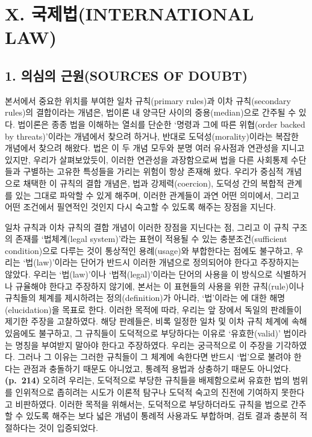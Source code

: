 \section{X. 국제법(INTERNATIONAL
LAW)}\label{x.-uxad6duxc81cuxbc95international-law}

\subsection{1. 의심의 근원(SOURCES OF
DOUBT)}\label{uxc758uxc2ecuxc758-uxadfcuxc6d0sources-of-doubt}

본서에서 중요한 위치를 부여한 일차 규칙(primary rules)과 이차
규칙(secondary rules)의 결합이라는 개념은, 법이론 내 양극단 사이의
중용(median)으로 간주될 수 있다. 법이론은 종종 법을 이해하는 열쇠를
단순한 `명령과 그에 따른 위협(order backed by threats)'이라는 개념에서
찾으려 하거나, 반대로 도덕성(morality)이라는 복잡한 개념에서 찾으려
해왔다. 법은 이 두 개념 모두와 분명 여러 유사점과 연관성을 지니고
있지만, 우리가 살펴보았듯이, 이러한 연관성을 과장함으로써 법을 다른
사회통제 수단들과 구별하는 고유한 특성들을 가리는 위험이 항상 존재해
왔다. 우리가 중심적 개념으로 채택한 이 규칙의 결합 개념은, 법과
강제력(coercion), 도덕성 간의 복합적 관계를 있는 그대로 파악할 수 있게
해주며, 이러한 관계들이 과연 어떤 의미에서, 그리고 어떤 조건에서
필연적인 것인지 다시 숙고할 수 있도록 해주는 장점을 지닌다.

일차 규칙과 이차 규칙의 결합 개념이 이러한 장점을 지닌다는 점, 그리고 이
규칙 구조의 존재를 `법체계(legal system)'라는 표현이 적용될 수 있는
충분조건(sufficient condition)으로 다루는 것이 통상적인 용례(usage)와
부합한다는 점에도 불구하고, 우리는 `법(law)'이라는 단어가 반드시 이러한
개념으로 정의되어야 한다고 주장하지는 않았다. 우리는 `법(law)'이나
`법적(legal)'이라는 단어의 사용을 이 방식으로 식별하거나 규율해야 한다고
주장하지 않기에, 본서는 이 표현들의 사용을 위한 규칙(rule)이나 규칙들의
체계를 제시하려는 정의(definition)가 아니라, `법'이라는
에 대한 해명(elucidation)을 목표로 한다. 이러한
목적에 따라, 우리는 앞 장에서 독일의 판례들이 제기한 주장을 고찰하였다.
해당 판례들은, 비록 일정한 일차 및 이차 규칙 체계에 속해 있음에도
불구하고, 그 규칙들이 도덕적으로 부당하다는 이유로 `유효한(valid)'
법이라는 명칭을 부여받지 말아야 한다고 주장하였다. 우리는 궁극적으로 이
주장을 기각하였다. 그러나 그 이유는 그러한 규칙들이 그 체계에 속한다면
반드시 `법'으로 불려야 한다는 관점과 충돌하기 때문도 아니었고, 통례적
용법과 상충하기 때문도 아니었다. \textbf{(p.~214)} 오히려 우리는,
도덕적으로 부당한 규칙들을 배제함으로써 유효한 법의 범위를 인위적으로
좁히려는 시도가 이론적 탐구나 도덕적 숙고의 진전에 기여하지 못한다고
비판하였다. 이러한 목적을 위해서는, 도덕적으로 부당하더라도 규칙을
법으로 간주할 수 있도록 해주는 보다 넓은 개념이 통례적 사용과도
부합하며, 검토 결과 충분히 적절하다는 것이 입증되었다.

